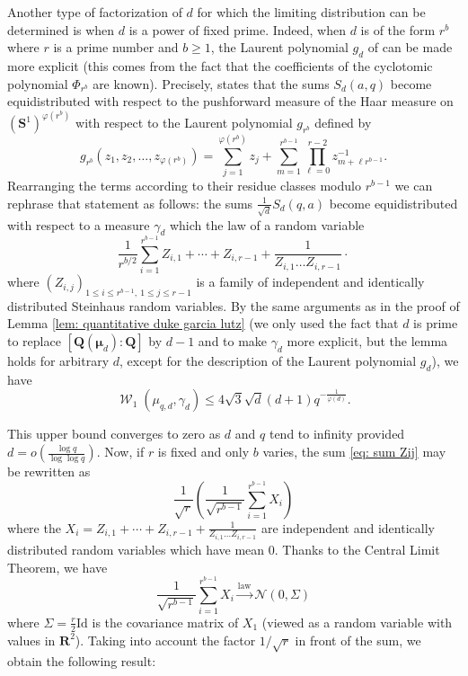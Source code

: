 \documentclass[12pt]{amsart}
\renewcommand{\mathcal}{\mathscr}
\newcommand{\Rr}{\mathbf{R}}
\newcommand{\Ss}{\mathbf{S}}
\newcommand{\Qq}{\mathbf{Q}}
\newcommand{\mmu}{\boldsymbol{\mu}}
\DeclareMathOperator{\wass}{\mathcal{W}}
\theoremstyle{plain}
\theoremstyle{remark}
\theoremstyle{definition}
\newcommand{\mcN}{\mathcal{N}}
\begin{document}
Another type of factorization of $d$ for which the limiting
distribution can be determined is when $d$ is a power of fixed
prime. Indeed, when $d$ is of the form $r^b$ where $r$ is a prime
number and $b \geqslant 1$, the Laurent polynomial $g_d$ of
\cite{gaussian_periods,menagerie} can be made more explicit (this
comes from the fact that the coefficients of the cyclotomic polynomial
$\Phi_{r^b}$ are known). Precisely, \cite[Cor. 1]{menagerie} states
that the sums $S_d(a,q)$ become equidistributed with respect to the
pushforward measure of the Haar measure on $(\Ss^1)^{\varphi(r^b)}$
with respect to the Laurent polynomial $g_{r^b}$ defined by
$$
g_{r^b}\left(z_1, z_2, \ldots, z_{\varphi(r^b)}\right)=\sum_{j=1}^{\varphi(r^b)} z_j+\sum_{m=1}^{r^{b-1}} \prod_{\ell=0}^{r-2} z_{m+\ell r^{b-1}}^{-1}.
$$
Rearranging the terms according to their residue classes modulo
$r^{b-1}$ we can rephrase that statement as follows: the sums
$\frac{1}{\sqrt{d}} S_d(q,a)$ become equidistributed with respect to a
measure $\gamma_d$ which the law of a random variable
\begin{equation} \label{eq: sum Zij} \frac{1}{r^{b/2}}\sum_{i =
    1}^{r^{b-1}} Z_{i,1} + \cdots + Z_{i,r-1} + \frac{1}{Z_{i,1}\dots
    Z_{i, r-1}} \cdot
\end{equation}
where
$(Z_{i,j})_{1 \leqslant i \leqslant r^{b-1}, \ 1 \leqslant j \leqslant
  r-1}$ is a family of independent and identically distributed
Steinhaus random variables. By the same arguments as in the proof of Lemma \ref{lem:
  quantitative duke garcia lutz} (we only used the fact that $d$ is
prime to replace $[\Qq(\mmu_d) : \Qq]$ by $d-1$ and to make $\gamma_d$ more explicit, but the lemma holds for
arbitrary $d$, except for the description of the Laurent polynomial
$g_d$), we have
$$
\wass_1(\mu_{q,d}, \gamma_d) \leqslant 4\sqrt{3} \sqrt{d} (d+1) q^{-\frac{1}{\varphi(d)}}.
$$

This upper bound converges to zero as $d$ and $q$ tend to infinity
provided $d = o \left( \frac{\log q}{\log \log q}\right)$. Now, if $r$
is fixed and only $b$ varies, the sum \eqref{eq: sum Zij} may be
rewritten as
$$
\frac{1}{\sqrt{r}} \left(\frac{1}{\sqrt{r^{b-1}}} \sum_{i =
    1}^{r^{b-1}} X_i\right)
$$
where the
$X_i = Z_{i,1} + \cdots + Z_{i,r-1} + \frac{1}{Z_{i,1}\dots Z_{i,
    r-1}}$ are independent and identically distributed random
variables which have mean $0$. Thanks to the Central Limit Theorem, we
have
$$
\frac{1}{\sqrt{r^{b-1}}} \sum_{i = 1}^{r^{b-1}}
X_i\overset{\text{law}}{\longrightarrow} \mcN(0, \Sigma)
$$
where $\Sigma = \frac{r}{2} \mathrm{Id}$ is the covariance matrix of
$X_1$ (viewed as a random variable with values in $\Rr^2$). Taking
into account the factor $1/ \sqrt{r}$ in front of the sum, we obtain
the following result:
\end{document}
